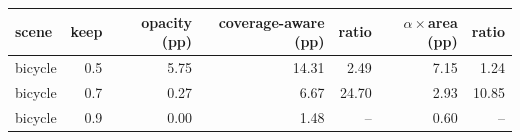 \begin{tabular}{lrrrrrr}
\toprule
scene & keep & opacity (pp) & coverage-aware (pp) & ratio & $\alpha\times$area (pp) & ratio \\
\midrule
bicycle & 0.5 & 5.75 & 14.31 & 2.49 & 7.15 & 1.24 \\
bicycle & 0.7 & 0.27 & 6.67 & 24.70 & 2.93 & 10.85 \\
bicycle & 0.9 & 0.00 & 1.48 & -- & 0.60 & -- \\
\bottomrule
\end{tabular}
